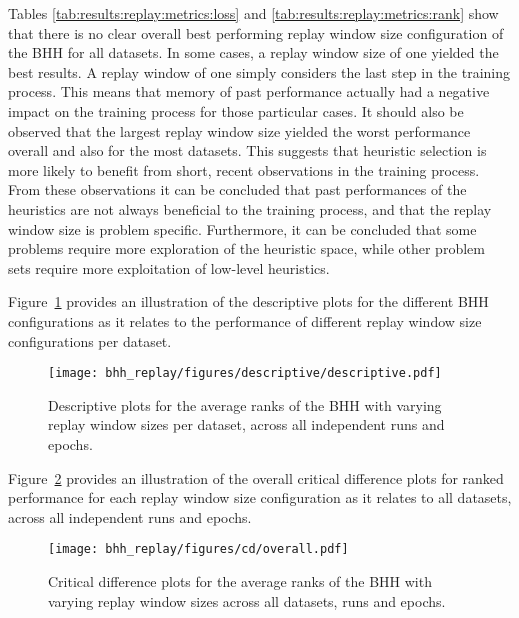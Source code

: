 Tables \ref{tab:results:replay:metrics:loss} and \ref{tab:results:replay:metrics:rank} show that there is no clear overall best performing replay window size configuration of the \acs{BHH} for all datasets. In some cases, a replay window size of one yielded the best results. A replay window of one simply considers the last step in the training process. This means that memory of past performance actually had a negative impact on the training process for those particular cases. It should also be observed that the largest replay window size yielded the worst performance overall and also for the most datasets. This suggests that heuristic selection is more likely to benefit from short, recent observations in the training process. From these observations it can be concluded that past performances of the heuristics are not always beneficial to the training process, and that the replay window size is problem specific. Furthermore, it can be concluded that some problems require more exploration of the heuristic space, while other problem sets require more exploitation of low-level heuristics.

Figure~\ref{fig:results:replay:descriptive:descriptive} provides an illustration of the descriptive plots for the different \acs{BHH} configurations as it relates to the performance of different replay window size configurations per dataset.

\begin{figure}[htb]
      \centering
      \texttt{[image: bhh\_replay/figures/descriptive/descriptive.pdf]}
      \caption{Descriptive plots for the average ranks of the \acs{BHH} with varying replay window sizes per dataset, across all independent runs and epochs.}
      \label{fig:results:replay:descriptive:descriptive}
\end{figure}

Figure~\ref{fig:results:replay:descriptive:cd} provides an illustration of the overall critical difference plots for ranked performance for each replay window size configuration as it relates to all datasets, across all independent runs and epochs.

\begin{figure}[htb]
      \centering
      \texttt{[image: bhh\_replay/figures/cd/overall.pdf]}
      \caption{Critical difference plots for the average ranks of the \acs{BHH} with varying replay window sizes across all datasets, runs and epochs.}
      \label{fig:results:replay:descriptive:cd}
\end{figure}

